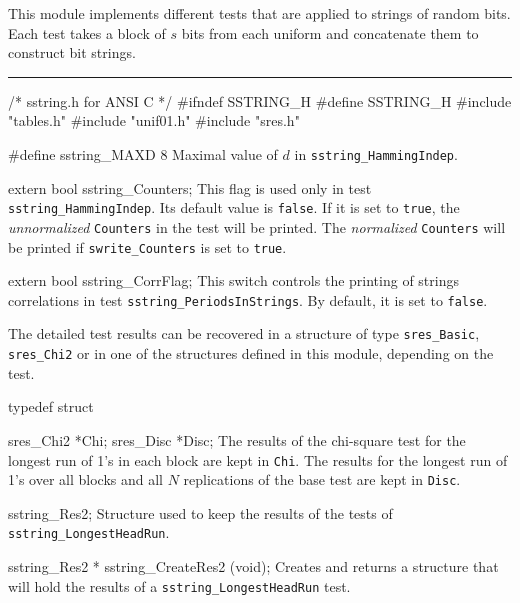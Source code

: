 
This module implements different tests that are applied to
strings of random bits.   Each test takes a block of $s$ bits
from each uniform and concatenate them to construct bit strings.
\resdef


\bigskip
\hrule
\code\hide
/* sstring.h for ANSI C */
#ifndef SSTRING_H
#define SSTRING_H
\endhide
#include "tables.h"
#include "unif01.h"
#include "sres.h"
\endcode
\ifdetailed  %

\code


#define sstring_MAXD 8
\endcode
 \tab
 Maximal value of $d$ in {\tt sstring\_HammingIndep}.
 \endtab
\code


extern bool sstring_Counters;
\endcode
 \tab
   This flag is used only in test {\tt sstring\_HammingIndep}.
   Its default value is {\tt false}.
   If it is set to {\tt true}, the {\it unnormalized} {\tt Counters} in
   the test will be printed. The {\it normalized} {\tt Counters}
   will be printed if   {\tt swrite\_Counters} is set to  {\tt true}.
 \endtab
\code


extern bool sstring_CorrFlag;
\endcode
 \tab
  This switch controls the printing of strings correlations
  in test {\tt sstring\_PeriodsInStrings}. By default, it is set to
  {\tt false}.
 \endtab




The detailed test results can be recovered in a structure of type
{\tt sres\_Basic}, {\tt sres\_Chi2} or in one of the structures
defined in this module, depending on the test.

\code

typedef struct {

   sres_Chi2 *Chi;
   sres_Disc *Disc;
\endcode
 \tabb
  The results of the chi-square test for the longest run of 1's in each
  block are kept in {\tt Chi}.  The results for the longest run of 1's
  over all blocks and all $N$ replications of the base test are kept in
  {\tt Disc}.
 \endtabb
\code

} sstring_Res2;
\endcode
 \tab
  Structure used to keep the results of the tests of
  {\tt sstring\_LongestHeadRun}.
 \endtab
\code


sstring_Res2 * sstring_CreateRes2 (void);
\endcode
 \tab
  Creates and returns a structure that will hold the results
  of a  {\tt sstring\_LongestHeadRun} test.
 \endtab
\code


